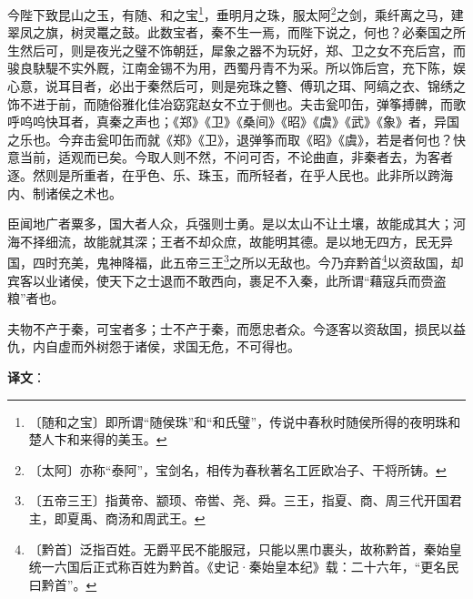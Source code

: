 \documentclass[12pt,UTF-8,openany]{ctexbook}
\begin{document}
\begin{normalsize}
    今陛下致昆山之玉，有随、和之宝\footnote{〔随和之宝〕即所谓“随侯珠”和“和氏璧”，传说中春秋时随侯所得的夜明珠和楚人卞和来得的美玉。}，垂明月之珠，服太阿\footnote{〔太阿〕亦称“泰阿”，宝剑名，相传为春秋著名工匠欧冶子、干将所铸。}之剑，乘纤离之马，建翠凤之旗，树灵鼍之鼓。此数宝者，秦不生一焉，而陛下说之，何也？必秦国之所生然后可，则是夜光之璧不饰朝廷，犀象之器不为玩好，郑、卫之女不充后宫，而骏良駃騠不实外厩，江南金锡不为用，西蜀丹青不为采。所以饰后宫，充下陈，娱心意，说耳目者，必出于秦然后可，则是宛珠之簪、傅玑之珥、阿缟之衣、锦绣之饰不进于前，而随俗雅化佳冶窈窕赵女不立于侧也。夫击瓮叩缶，弹筝搏髀，而歌呼呜呜快耳者，真秦之声也；《郑》《卫》《桑间》《昭》《虞》《武》《象》者，异国之乐也。今弃击瓮叩缶而就《郑》《卫》，退弹筝而取《昭》《虞》，若是者何也？快意当前，适观而已矣。今取人则不然，不问可否，不论曲直，非秦者去，为客者逐。然则是所重者，在乎色、乐、珠玉，而所轻者，在乎人民也。此非所以跨海内、制诸侯之术也。
    
    臣闻地广者粟多，国大者人众，兵强则士勇。是以太山不让土壤，故能成其大；河海不择细流，故能就其深；王者不却众庶，故能明其德。是以地无四方，民无异国，四时充美，鬼神降福，此五帝三王\footnote{〔五帝三王〕指黄帝、颛顼、帝喾、尧、舜。三王，指夏、商、周三代开国君主，即夏禹、商汤和周武王。}之所以无敌也。今乃弃黔首\footnote{〔黔首〕泛指百姓。无爵平民不能服冠，只能以黑巾裹头，故称黔首，秦始皇统一六国后正式称百姓为黔首。《史记·秦始皇本纪》载：二十六年，“更名民曰黔首”。}以资敌国，却宾客以业诸侯，使天下之士退而不敢西向，裹足不入秦，此所谓“藉寇兵而赍盗粮”者也。
    
    夫物不产于秦，可宝者多；士不产于秦，而愿忠者众。今逐客以资敌国，损民以益仇，内自虚而外树怨于诸侯，求国无危，不可得也。
\end{normalsize}


\newpage

\textbf{译文}：

\vspace{1em}
\end{document}
